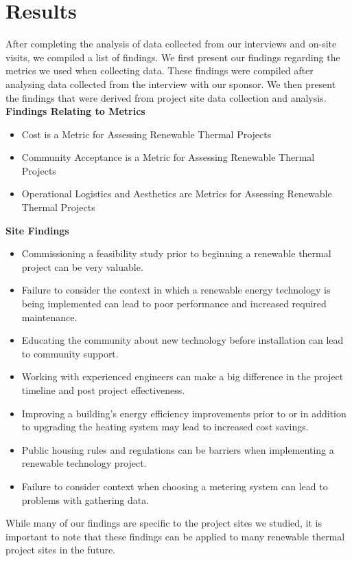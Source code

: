 \section*{Results}
\par After completing the analysis of data collected from our interviews and on-site visits, we compiled a list of findings. We first present our findings regarding the metrics we used when collecting data. These findings were compiled after analysing data collected from the interview with our sponsor. We then present the findings that were derived from project site data collection and analysis.\\

\noindent
\textbf{Findings Relating to Metrics}
\begin{itemize}
  \item{Cost is a Metric for Assessing Renewable Thermal Projects}
  \item{Community Acceptance is a Metric for Assessing Renewable Thermal Projects}
  \item{Operational Logistics and Aesthetics are Metrics for Assessing Renewable Thermal Projects}
\end{itemize}

\noindent
\textbf{Site Findings}
\begin{itemize}
  \item{Commissioning a feasibility study prior to beginning a renewable thermal project can be very valuable.}
  \item{Failure to consider the context in which a renewable energy technology is being implemented can lead to poor performance and increased required maintenance.}
  \item{Educating the community about new technology before installation can lead to community support.}
  \item{Working with experienced engineers can make a big difference in the project timeline and post project effectiveness.}
  \item{Improving a building’s energy efficiency improvements prior to or in addition to upgrading the heating system may lead to increased cost savings.}
  \item{Public housing rules and regulations can be barriers when implementing a renewable technology project.}
  \item{Failure to consider context when choosing a metering system can lead to problems with gathering data.}
\end{itemize}
\par While many of our findings are specific to the project sites we studied, it is important to note that these findings can be applied to many renewable thermal project sites in the future.

